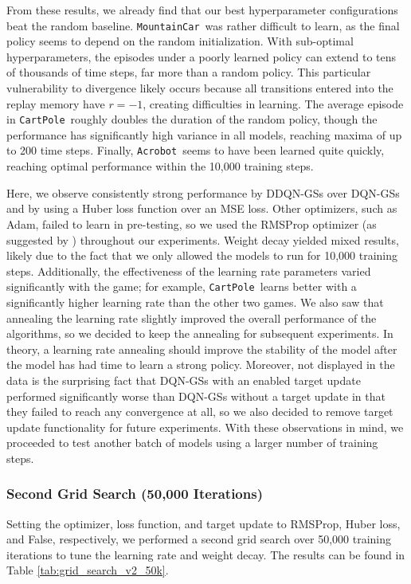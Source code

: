 \documentclass[11pt]{article}
\newcommand{\cp}{\texttt{CartPole}}
\newcommand{\ab}{\texttt{Acrobot}}
\newcommand{\mc}{\texttt{MountainCar}}
\begin{document}
From these results, we already find that our best hyperparameter configurations beat the random baseline. \mc~was rather difficult to learn, as the final policy seems to depend on the random initialization. With sub-optimal hyperparameters, the episodes under a poorly learned policy can extend to tens of thousands of time steps, far more than a random policy. This particular vulnerability to divergence likely occurs because all transitions entered into the replay memory have $r = -1$, creating difficulties in learning. The average episode in \cp~roughly doubles the duration of the random policy, though the performance has significantly high variance in all models, reaching maxima of up to 200 time steps. Finally, \ab~seems to have been learned quite quickly, reaching optimal performance within the 10,000 training steps.

Here, we observe consistently strong performance by DDQN-GSs over DQN-GSs and by using a Huber loss function over an MSE loss. Other optimizers, such as Adam, failed to learn in pre-testing, so we used the RMSProp optimizer (as suggested by \cite{mnih2013playing}) throughout our experiments. Weight decay yielded mixed results, likely due to the fact that we only allowed the models to run for 10,000 training steps. Additionally, the effectiveness of the learning rate parameters varied significantly with the game; for example, \cp~learns better with a significantly higher learning rate than the other two games. We also saw that annealing the learning rate slightly improved the overall performance of the algorithms, so we decided to keep the annealing for subsequent experiments. In theory, a learning rate annealing should improve the stability of the model after the model has had time to learn a strong policy. Moreover, not displayed in the data is the surprising fact that DQN-GSs with an enabled target update performed significantly worse than DQN-GSs without a target update in that they failed to reach any convergence at all, so we also decided to remove target update functionality for future experiments. With these observations in mind, we proceeded to test another batch of models using a larger number of training steps. 

\subsubsection{Second Grid Search (50,000 Iterations)}
 
Setting the optimizer, loss function, and target update to RMSProp, Huber loss, and False, respectively, we performed a second grid search over 50,000 training iterations to tune the learning rate and weight decay. The results can be found in Table \ref{tab:grid_search_v2_50k}.
\end{document}
